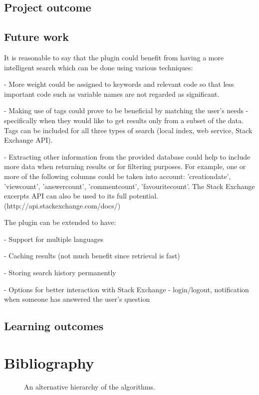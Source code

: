 \documentclass{l4proj}
\begin{document}
\section{Project outcome}

\section{Future work}
It is reasonable to say that the plugin could benefit from having a more intelligent search which can be done using various techniques:

- More weight could be assigned to keywords and relevant code so that less important code such as variable names are not regarded as significant. 

- Making use of tags could prove to be beneficial by matching the user's needs - specifically when they would like to get results only from a subset of the data. Tags can be included for all three types of search (local index, web service, Stack Exchange API).

- Extracting other information from the provided database could help to include more data when returning results or for filtering purposes. For example, one or more of the following columns could be taken into account: 'creationdate', 'viewcount', 'answercount', 'commentcount', 'favouritecount'. The Stack Exchange excerpts API can also be used to its full potential. (http://api.stackexchange.com/docs/)

The plugin can be extended to have:

- Support for multiple languages

- Caching results (not much benefit since retrieval is fast)

- Storing search history permanently

- Options for better interaction with Stack Exchange - login/logout, notification when someone has answered the user's question
\section{Learning outcomes}

\chapter{Bibliography}

\begin{figure}
\centering
\vspace{-30mm}
\caption{An alternative hierarchy of the algorithms.}
\label{uroborus}
\end{figure}
\end{document}
